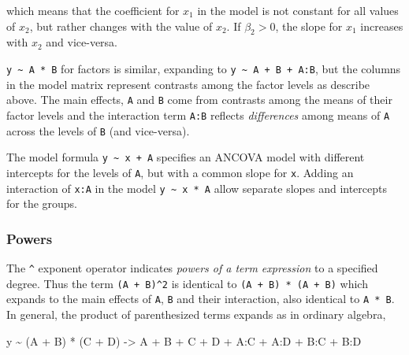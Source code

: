 \documentclass[
  letterpaper,
  10pt,
  krantz2]{krantz}
\makeatletter
\newenvironment{Shaded}{\begin{snugshade}}{\end{snugshade}}
\newcommand{\NormalTok}[1]{\textcolor[rgb]{0.00,0.23,0.31}{#1}}
\newcommand{\OtherTok}[1]{\textcolor[rgb]{0.00,0.23,0.31}{#1}}
\newcommand{\SpecialCharTok}[1]{\textcolor[rgb]{0.37,0.37,0.37}{#1}}
\newenvironment{kframe}{%
  \medskip{}
  \setlength{\fboxsep}{.8em}
  \def\at@end@of@kframe{}%
  \ifinner\ifhmode%
  \def\at@end@of@kframe{\end{minipage}}%
  \begin{minipage}{\columnwidth}%
  \fi\fi%
  \def\FrameCommand##1{\hskip\@totalleftmargin \hskip-\fboxsep
  \colorbox{shadecolor}{##1}\hskip-\fboxsep
      \hskip-\linewidth \hskip-\@totalleftmargin \hskip\columnwidth}%
  \MakeFramed {\advance\hsize-\width
    \@totalleftmargin\z@ \linewidth\hsize
    \@setminipage}}%
{\par\unskip\endMakeFramed%
  \at@end@of@kframe}
\renewenvironment{Shaded}{\begin{kframe}}{\end{kframe}}
\makeatother
\begin{document}
which means that the coefficient for \(x_1\) in the model is not
constant for all values of \(x_2\), but rather changes with the value of
\(x_2\). If \(\beta_2 > 0\), the slope for \(x_1\) increases with
\(x_2\) and vice-versa.

\texttt{y\ \textasciitilde{}\ A\ *\ B} for factors is similar, expanding
to \texttt{y\ \textasciitilde{}\ A\ +\ B\ +\ A:B}, but the columns in
the model matrix represent contrasts among the factor levels as describe
above. The main effects, \texttt{A} and \texttt{B} come from contrasts
among the means of their factor levels and the interaction term
\texttt{A:B} reflects \emph{differences} among means of \texttt{A}
across the levels of \texttt{B} (and vice-versa).

The model formula \texttt{y\ \textasciitilde{}\ x\ +\ A} specifies an
ANCOVA model with different intercepts for the levels of \texttt{A}, but
with a common slope for \texttt{x}. Adding an interaction of
\texttt{x:A} in the model \texttt{y\ \textasciitilde{}\ x\ *\ A} allow
separate slopes and intercepts for the groups.

\subsubsection{Powers}\label{powers}

The \texttt{\^{}} exponent operator indicates \emph{powers of a term
expression} to a specified degree. Thus the term \texttt{(A\ +\ B)\^{}2}
is identical to \texttt{(A\ +\ B)\ *\ (A\ +\ B)} which expands to the
main effects of \texttt{A}, \texttt{B} and their interaction, also
identical to \texttt{A\ *\ B}. In general, the product of parenthesized
terms expands as in ordinary algebra,

\begin{Shaded}
\begin{Highlighting}[]
\NormalTok{y }\SpecialCharTok{\textasciitilde{}}\NormalTok{ (A }\SpecialCharTok{+}\NormalTok{ B) }\SpecialCharTok{*}\NormalTok{ (C }\SpecialCharTok{+}\NormalTok{ D) }\OtherTok{{-}\textgreater{}}\NormalTok{ A }\SpecialCharTok{+}\NormalTok{ B }\SpecialCharTok{+}\NormalTok{ C }\SpecialCharTok{+}\NormalTok{ D }\SpecialCharTok{+}\NormalTok{ A}\SpecialCharTok{:}\NormalTok{C }\SpecialCharTok{+}\NormalTok{ A}\SpecialCharTok{:}\NormalTok{D }\SpecialCharTok{+}\NormalTok{ B}\SpecialCharTok{:}\NormalTok{C }\SpecialCharTok{+}\NormalTok{ B}\SpecialCharTok{:}\NormalTok{D}
\end{Highlighting}
\end{Shaded}
\end{document}
